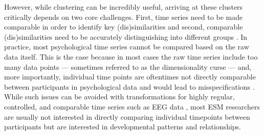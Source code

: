 \documentclass[man, 12pt, a4paper, mask, floatsintext]{apa7}
\theoremstyle{break}
\theoremstyle{plain}
\begin{document}


However, while clustering can be incredibly useful, arriving at these clusters critically depends on two core challenges. First, time series need to be made comparable in order to identify key (dis)similarities and second, comparable (dis)similarities need to be accurately distinguishing into different groups \citep[e.g.,][]{Aghabozorgi2015}. In practice, most psychological time series cannot be compared based on the raw data itself. This is the case because in most cases the raw time series include too many data points --- sometimes referred to as the dimensionality curse \citep[e.g.,][]{altman2018} --- and, more importantly, individual time points are oftentimes not directly comparable between participants in psychological data and would lead to misspecifications \citep[e.g., ][]{faloutsos1994}. While such issues can be avoided with transformations for highly regular, controlled, and comparable time series such as EEG data \citep[e.g.,][]{huang1985}, most ESM researchers are usually not interested in directly comparing individual timepoints between participants but are interested in developmental patterns and relationships. 
\end{document}
